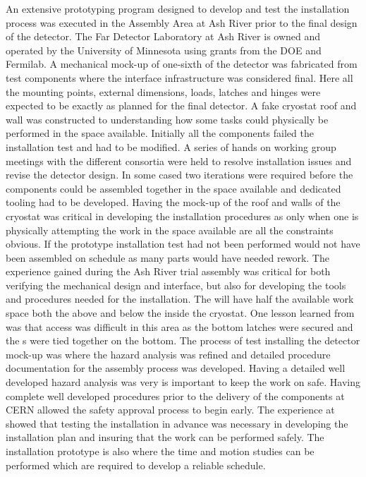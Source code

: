 An extensive prototyping program designed to develop and test the  installation process was executed in the \nova Assembly Area at Ash River prior to the final design of the  detector. 
The \nova Far Detector Laboratory at Ash River is owned and operated by the University of Minnesota using grants from the DOE and Fermilab.
A mechanical mock-up of one-sixth of the detector was fabricated from test components where the interface infrastructure was considered final. 
Here all the mounting points, external dimensions, loads, latches and hinges were expected to be exactly as planned for the final  detector.
A fake cryostat roof and wall was constructed to understanding how some tasks could physically be performed in the space available.
Initially all the components failed the installation test and had to be modified. A series of hands on working group meetings with the different consortia were held to resolve installation issues and revise the detector design. 
In some cased two iterations were required before the components could be assembled together in the space available and dedicated tooling had to be developed. 
Having the mock-up of the roof and walls of the cryostat was critical in developing the installation procedures as only when one is physically attempting the work in the space available are all the constraints obvious. 
If the prototype installation test had not been performed  would not have been assembled on schedule as many parts would have needed rework.
The experience gained during the  Ash River trial assembly was critical for both verifying the mechanical design and interface, but also for developing the tools and procedures needed for the installation.
The   will have half the available work space  both the above and below the  inside the cryostat.  
One lesson learned from  was that access was difficult in this area as the bottom latches were secured and the s were tied together on the bottom.  
The process of test installing the detector mock-up was where the hazard analysis was refined and detailed procedure documentation for the assembly process was developed. 
Having a detailed well developed hazard analysis was very is important to keep the work on  safe. Having complete well developed procedures prior to the delivery of the components at CERN allowed the safety approval process to begin early.   The experience at  showed that testing the installation in advance was necessary in developing the installation plan and insuring that the work can be performed safely. The  installation prototype is also where the time and motion studies can be performed which are required to develop a reliable schedule.

